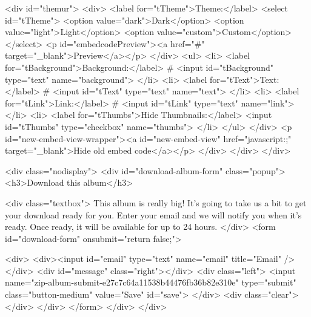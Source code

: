             <div id="themur">
                <div>
                    <label for="tTheme">Theme:</label>
                    <select id="tTheme">
                        <option value="dark">Dark</option>
                        <option value="light">Light</option>
                        <option value="custom">Custom</option>
                    </select>
                    <p id="embedcodePreview"><a href="#" target="_blank">Preview</a></p>
                </div>
                <ul>
                    <li>
                        <label for="tBackground">Background:</label> # <input id="tBackground" type="text" name="background">
                    </li>
                    <li>
                        <label for="tText">Text:</label> # <input id="tText" type="text" name="text">
                    </li>
                    <li>
                        <label for="tLink">Link:</label> # <input id="tLink" type="text" name="link">
                    </li>
                    <li>
                        <label for="tThumbs">Hide Thumbnails:</label> <input id="tThumbs" type="checkbox" name="thumbs">
                    </li>
                </ul>
            </div>
            <p id="new-embed-view-wrapper"><a id="new-embed-view" href="javascript:;" target="_blank">Hide old embed code</a></p>
        </div>
    </div>
</div>

    <div class="nodisplay">
	<div id="download-album-form" class="popup">
		<h3>Download this album</h3>
		
		<div class="textbox">
			This album is really big! It's going to take us a bit to get your download ready for you.  Enter your email and we will notify you when it's ready. Once ready, it will be available for up to 24 hours.
		</div>
        <form id="download-form" onsubmit="return false;">
		
		<div>
            <div><input id="email" type="text" name="email" title="Email" /></div>
            <div id="message" class="right"></div>
            <div class="left">
                <input name="zip-album-submit-e27c7c64a11538b44476fb36b82e310e" type="submit" class="button-medium" value="Save" id="save">
            </div>
            <div class="clear"></div>
        </div>
        </form>
	</div>
</div>

